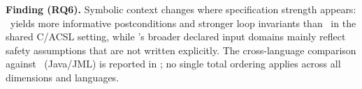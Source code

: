 \begin{finding}
{\textbf{Finding (RQ6).} Symbolic context changes where specification strength appears: \toolname\ yields more informative postconditions and stronger loop invariants than \autospec\ in the shared C/ACSL setting, while \autospec's broader declared input domains mainly reflect safety assumptions that are not written explicitly. The cross-language comparison against \specgen\ (Java/JML) is reported in ; no single total ordering applies across all dimensions and languages.}
\end{finding}
